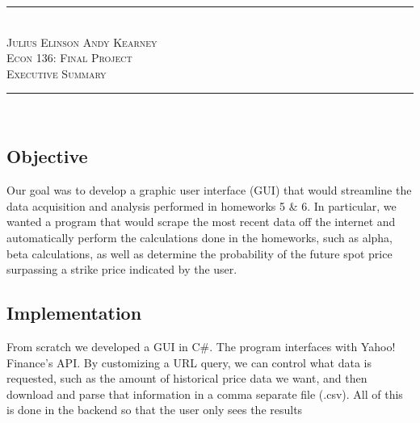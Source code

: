 \documentclass[pdftex,12pt]{article}
\theoremstyle{definition}
\theoremstyle{remark}
\begin{document}
\newcommand{\HRule}{\rule{\linewidth}{0.4mm}}
\begin{center}
\HRule \\
\textsc{Julius Elinson} \hfill \textsc{Andy Kearney}\\[.1cm]
\textsc{\Large{Econ 136: Final Project \\Executive Summary}}\\[-.1cm] %
\HRule \\[.4cm]
\end{center}
\subsection*{Objective}
Our goal was to develop a graphic user interface (GUI) that would streamline the data acquisition and analysis performed in homeworks 5 \& 6. In particular, we wanted a program that would scrape the most recent data off the internet and automatically perform the calculations done in the homeworks, such as alpha, beta calculations, as well as determine the probability of the future spot price surpassing a strike price indicated by the user.
\subsection*{Implementation}
From scratch we developed a GUI in C\#. The program interfaces with Yahoo! Finance's API. By customizing a URL query, we can control what data is requested, such as the amount of historical price data we want, and then download and parse that information in a comma separate file (.csv). All of this is done in the backend so that the user only sees the results
\end{document}
